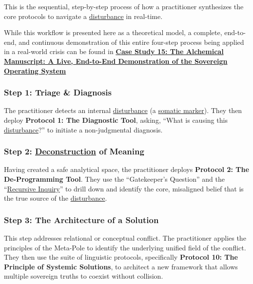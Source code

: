 \documentclass{article}
\begin{document}
This is the sequential, step-by-step process of how a practitioner synthesizes the core protocols to navigate a \hyperlink{gloss:disturbance}{disturbance} in real-time.

While this workflow is presented here as a theoretical model, a complete, end-to-end, and continuous demonstration of this entire four-step process being applied in a real-world crisis can be found in \hyperref[case_study_15]{\textbf{Case Study 15: The Alchemical Manuscript: A Live, End-to-End Demonstration of the Sovereign Operating System}}

\subsubsection*{Step 1: Triage \& Diagnosis}
The practitioner detects an internal \hyperlink{gloss:disturbance}{disturbance} (a \hyperlink{gloss:somatic_marker}{somatic marker}). They then deploy \textbf{Protocol 1: The Diagnostic Tool}, asking, ``What is causing this \hyperlink{gloss:disturbance}{disturbance}?'' to initiate a non-judgmental diagnosis.

\subsubsection*{Step 2: \hyperlink{gloss:deconstruction}{Deconstruction} of Meaning}
Having created a safe analytical space, the practitioner deploys \textbf{Protocol 2: The De-Programming Tool}. They use the ``Gatekeeper's Question'' and the ``\hyperlink{gloss:recursive_inquiry}{Recursive Inquiry}'' to drill down and identify the core, misaligned belief that is the true source of the \hyperlink{gloss:disturbance}{disturbance}.

\subsubsection*{Step 3: The Architecture of a Solution}
This step addresses relational or conceptual conflict. The practitioner applies the principles of the Meta-Pole to identify the underlying unified field of the conflict. They then use the suite of linguistic protocols, specifically \textbf{Protocol 10: The Principle of Systemic Solutions}, to architect a new framework that allows multiple sovereign truths to coexist without collision.
\end{document}
